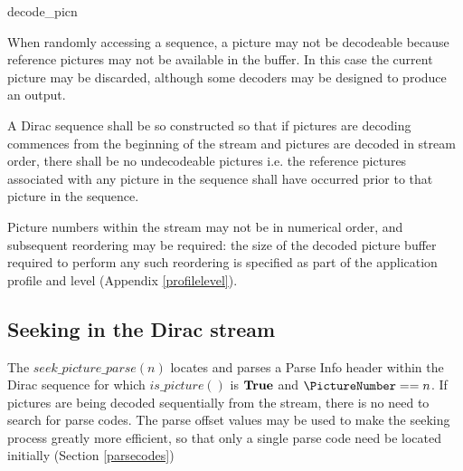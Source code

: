 \begin{pseudo}{decode\_pic}{n}
\bsIF{\ZeroResidual==\false}
\bsEND
{}
    \bsEND
\bsEND
{}
\bsEND
{}
\end{pseudo}

When randomly accessing a sequence, a picture may not be decodeable because reference pictures
may not be available in the buffer. In this case the current picture may be discarded, although some
decoders may be designed to produce an output. 

A Dirac sequence shall be so constructed so that if
pictures are decoding commences from the beginning of the stream and pictures are decoded in 
stream order, there shall be no undecodeable pictures i.e. the reference pictures associated with
any picture in the sequence shall have occurred prior to that picture in the sequence.

Picture numbers within the stream may not be in numerical order, and subsequent reordering may be
required: the size of the decoded picture buffer required to perform any such reordering is specified
as part of the application profile and level (Appendix \ref{profilelevel}).

\subsection{Seeking in the Dirac stream}
\label{seeking}

The $seek\_picture\_parse(n)$ locates and parses a Parse Info header within the Dirac sequence for
which $is\_picture()$ is $\text{\bf{True}}$ and $\PictureNumber==n$. If pictures are being decoded sequentially
from the stream, there is no need to search for parse codes. The parse offset values may be used
to make the seeking process greatly more efficient, so that only a single parse code need be located
initially (Section \ref{parsecodes})

